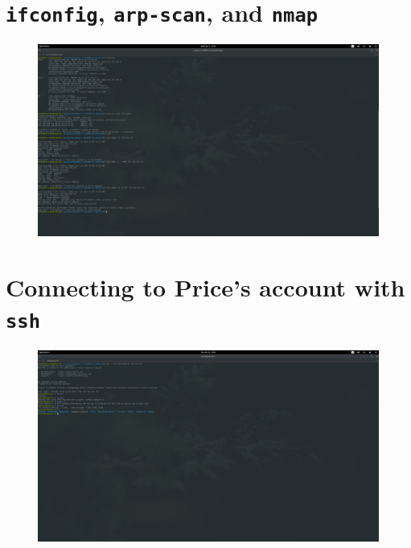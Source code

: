 \documentclass[12pt]{report}
\begin{document}
\section{\texttt{ifconfig}, \texttt{arp-scan}, and \texttt{nmap}}
\label{app:screenshots:1}
\begin{figure}[H]
  \centering
  \includegraphics[width=0.7\paperheight, angle=-90]{It's_Elementary_my_dear_Watson!-2017-12-06-13-41-10}
\end{figure}
\section{Connecting to Price's account with \texttt{ssh}}
\label{app:screenshots:2}
\begin{figure}[H]
  \centering
  \includegraphics[width=0.7\paperheight, angle=-90]{It's_Elementary_my_dear_Watson!-2017-12-19-15-19-29}
\end{figure}
\end{document}
